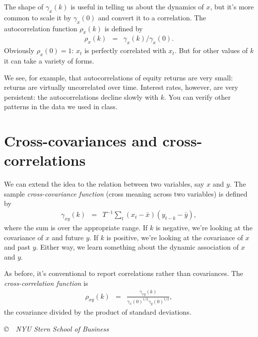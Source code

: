 \documentclass[11pt]{article}
\begin{document}
The shape of $\gamma_x(k)$ is useful in telling us about the dynamics of $x$,
but it's more common to scale it by $\gamma_x(0)$ and convert it to
a correlation.
The autocorrelation function $\rho_x(k)$ is defined by
\begin{eqnarray*}
    \rho_x(k)  &=&  \gamma_x(k)/\gamma_x(0).
\end{eqnarray*}
Obviously $\rho_x(0) = 1$:  $x_t$ is perfectly correlated with $x_t$.
But for other values of $k$ it can take a variety of forms.

We see, for example, that autocorrelations of equity returns are very small:
returns are virtually uncorrelated over time.
Interest rates, however, are very persistent:
the autocorrelations decline slowly with $k$.
You can verify other patterns in the data we used in class.

\section{Cross-covariances and cross-correlations}

We can extend the idea to the relation between two variables, say $x$ and $y$.
The sample {\it cross-covariance function\/} (cross meaning across two variables)
is defined by
\begin{eqnarray*}
    \gamma_{xy}(k)  &=&
            T^{-1} \sum_{t} (x_t - \bar{x}) (y_{t-k} - \bar{y}) ,
\end{eqnarray*}
where the sum is over the appropriate range.
If $k$ is negative, we're looking at the covariance of
$x$ and future $y$.
If $k$ is positive, we're looking at the covariance of
$x$ and past $y$.
Either way, we learn something about the dynamic association of $x$ and $y$.

As before, it's conventional to report correlations rather than covariances.
The {\it cross-correlation function\/} is
\begin{eqnarray*}
    \rho_{xy}(k)  &=&  \frac{\gamma_{xy}(k)}{\gamma_{x}(0)^{1/2}\gamma_{y}(0)^{1/2}} ,
\end{eqnarray*}
the covariance divided by the product of standard deviations.

\vfill \centerline{\it \copyright \ \number\year \
NYU Stern School of Business}
\end{document}
